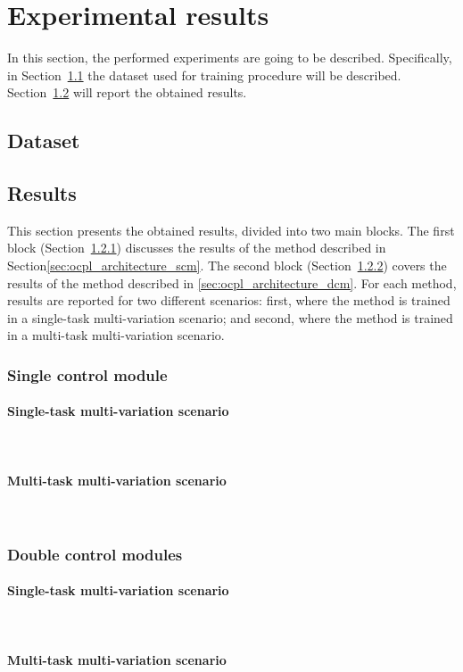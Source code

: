 \section{Experimental results}
\label{sec:ocpl_experimental}

In this section, the performed experiments are going to be described. Specifically, in  
Section~\ref{sec:ocpl_dataset} the dataset used for training procedure will be described. Section~\ref{sec:ocpl_results} will report the obtained results.
\subsection{Dataset}
\label{sec:ocpl_dataset}

\subsection{Results}
\label{sec:ocpl_results}
This section presents the obtained results, divided into two main blocks. The first block (Section~\ref{sec:ocpl_results_scm}) discusses the results of the method described in Section\ref{sec:ocpl_architecture_scm}. The second block (Section~\ref{sec:ocpl_results_dcm}) covers the results of the method described in \ref{sec:ocpl_architecture_dcm}. For each method, results are reported for two different scenarios: first, where the method is trained in a single-task multi-variation scenario; and second, where the method is trained in a multi-task multi-variation scenario.

\subsubsection{Single control module}
\label{sec:ocpl_results_scm}
\paragraph*{Single-task multi-variation scenario}\mbox{}\\
\paragraph*{Multi-task multi-variation scenario}\mbox{}\\

\subsubsection{Double control modules}
\label{sec:ocpl_results_dcm}
\paragraph*{Single-task multi-variation scenario}\mbox{}\\
\paragraph*{Multi-task multi-variation scenario}\mbox{}\\